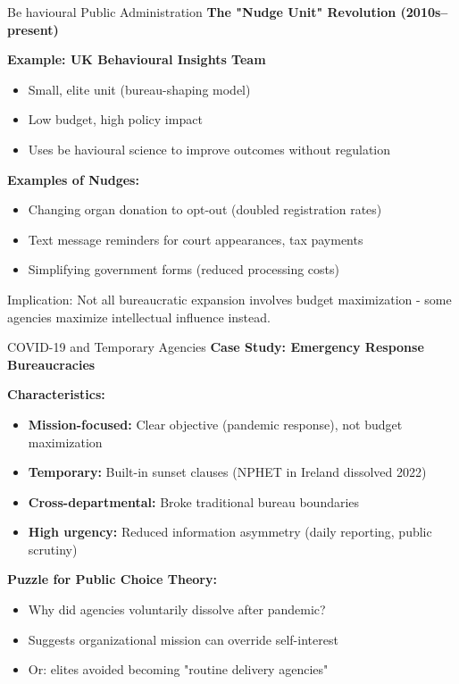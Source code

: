 \documentclass[10pt]{beamer}
\begin{document}
\begin{frame}{Be havioural Public Administration}
\textbf{The "Nudge Unit" Revolution (2010s–present)}


\textbf{Example: UK Behavioural Insights Team}
\begin{itemize}
\item Small, elite unit (bureau-shaping model)
\item Low budget, high policy impact
\item Uses be havioural science to improve outcomes without regulation
\end{itemize}


\textbf{Examples of Nudges:}
\begin{itemize}
\item Changing organ donation to opt-out (doubled registration rates)
\item Text message reminders for court appearances, tax payments
\item Simplifying government forms (reduced processing costs)
\end{itemize}


\alert{Implication:} Not all bureaucratic expansion involves budget maximization - some agencies maximize intellectual influence instead.
\end{frame}

\begin{frame}{COVID-19 and Temporary Agencies}
\textbf{Case Study: Emergency Response Bureaucracies}


\textbf{Characteristics:}
\begin{itemize}
\item \textbf{Mission-focused:} Clear objective (pandemic response), not budget maximization
\item \textbf{Temporary:} Built-in sunset clauses (NPHET in Ireland dissolved 2022)
\item \textbf{Cross-departmental:} Broke traditional bureau boundaries
\item \textbf{High urgency:} Reduced information asymmetry (daily reporting, public scrutiny)
\end{itemize}


\textbf{Puzzle for Public Choice Theory:}
\begin{itemize}
\item Why did agencies voluntarily dissolve after pandemic?
\item Suggests organizational mission can override self-interest
\item Or: elites avoided becoming "routine delivery agencies"
\end{itemize}
\end{frame}
\end{document}

